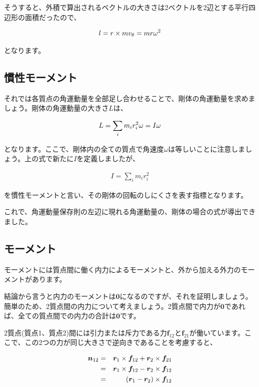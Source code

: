 そうすると、外積で算出されるベクトルの大きさは2ベクトルを2辺とする平行四辺形の面積だったので、

\begin{eqnarray}
    l=r\times mv_\theta=mr\omega^2 \notag
\end{eqnarray}

となります。

\subsection{慣性モーメント}
それでは各質点の角運動量を全部足し合わせることで、剛体の角運動量を求めましょう。剛体の角運動量の大きさ$L$は、

\begin{eqnarray}
    L=\sum_i m_ir_i^2\omega=I\omega \notag
\end{eqnarray}

となります。ここで、剛体内の全ての質点で角速度$\omega$は等しいことに注意しましょう。上の式で新たに$I$を定義しましたが、

\begin{eqnarray}
    I=\sum_i m_ir_i^2
\end{eqnarray}

を慣性モーメントと言い、その剛体の回転のしにくさを表す指標となります。

これで、角運動量保存則の左辺に現れる角運動量の、剛体の場合の式が導出できました。

\subsection{モーメント}
モーメントには質点間に働く内力によるモーメントと、外から加える外力のモーメントがあります。

結論から言うと内力のモーメントは$\bm{0}$になるのですが、それを証明しましょう。簡単のため、2質点間の内力について考えましょう。2質点間で内力が$\bm{0}$であれば、全ての質点間での内力の合計は$\bm{0}$です。

2質点(質点1、質点2)間には引力または斥力である力$\bm{f}_{12}$と$\bm{f}_{21}$が働いています。ここで、この2つの力が同じ大きさで逆向きであることを考慮すると、

\begin{eqnarray}
    \bm{n}_{12}&=&\bm{r}_1\times\bm{f}_{12}+\bm{r}_2\times\bm{f}_{21} \notag \\
    &=&\bm{r}_1\times\bm{f}_{12}-\bm{r}_2\times\bm{f}_{12} \notag \\
    &=&(\bm{r}_1-\bm{r}_2)\times\bm{f}_{12} \notag
\end{eqnarray}

